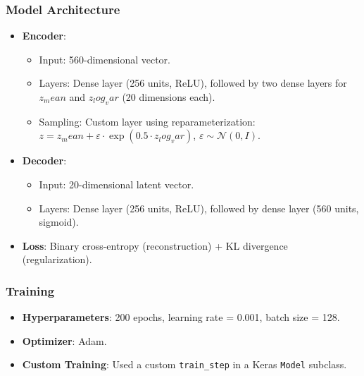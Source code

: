 \documentclass[12pt]{article}
\begin{document}
	\subsubsection{Model Architecture}
	\begin{itemize}
		\item \textbf{Encoder}:
		\begin{itemize}
			\item Input: 560-dimensional vector.
			\item Layers: Dense layer (256 units, ReLU), followed by two dense layers for \(z_mean\) and \(z_log_var\) (20 dimensions each).
			\item Sampling: Custom layer using reparameterization: \(z = z_mean + \varepsilon \cdot \exp(0.5 \cdot z_log_var)\), \(\varepsilon \sim \mathcal{N}(0, I)\).
		\end{itemize}
		\item \textbf{Decoder}:
		\begin{itemize}
			\item Input: 20-dimensional latent vector.
			\item Layers: Dense layer (256 units, ReLU), followed by dense layer (560 units, sigmoid).
		\end{itemize}
		\item \textbf{Loss}: Binary cross-entropy (reconstruction) + KL divergence (regularization).
	\end{itemize}
	
	\subsubsection{Training}
	\begin{itemize}
		\item \textbf{Hyperparameters}: 200 epochs, learning rate = 0.001, batch size = 128.
		\item \textbf{Optimizer}: Adam.
		\item \textbf{Custom Training}: Used a custom \texttt{train_step} in a Keras \texttt{Model} subclass.
	\end{itemize}
	
\end{document}
